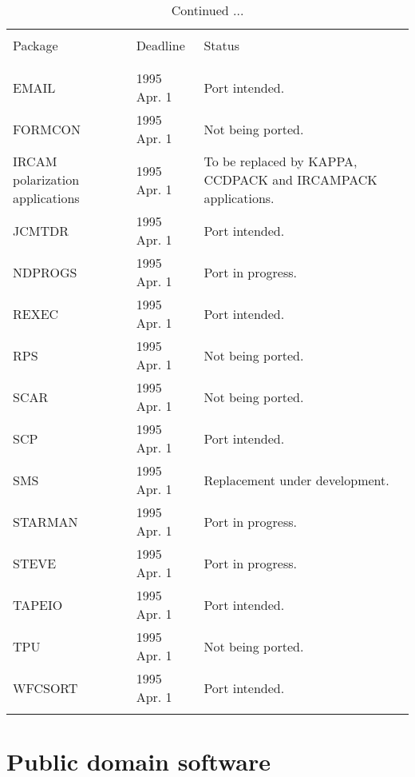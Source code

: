 \addtocounter{table}{-1}
\begin{table}
\caption{Continued ...}
\vspace{5mm}
\begin{center}
\begin{tabular}{|p{36mm}|p{30mm}|p{60mm}|} \hline
& & \\
Package & Deadline & Status \\
& & \\ \hline
& & \\
EMAIL                           & 1995 Apr. 1  & Port intended. \\
FORMCON                         & 1995 Apr. 1  & Not being ported. \\
IRCAM polarization applications & 1995 Apr. 1  & To be replaced by
   KAPPA, CCDPACK and IRCAMPACK applications. \\
JCMTDR                          & 1995 Apr. 1  & Port intended. \\
NDPROGS                         & 1995 Apr. 1  & Port in progress. \\
REXEC                           & 1995 Apr. 1  & Port intended. \\
RPS                             & 1995 Apr. 1  & Not being ported. \\
SCAR                            & 1995 Apr. 1  & Not being ported. \\
SCP                             & 1995 Apr. 1  & Port intended. \\
SMS                             & 1995 Apr. 1  & Replacement under
   development. \\
STARMAN                         & 1995 Apr. 1  & Port in progress. \\
STEVE                           & 1995 Apr. 1  & Port in progress. \\
TAPEIO                          & 1995 Apr. 1  & Port intended. \\
TPU                             & 1995 Apr. 1  & Not being ported. \\
WFCSORT                         & 1995 Apr. 1  & Port intended. \\
& & \\ \hline
\end{tabular}
\end{center}
\end{table}

\newpage
\section{Public domain software}

